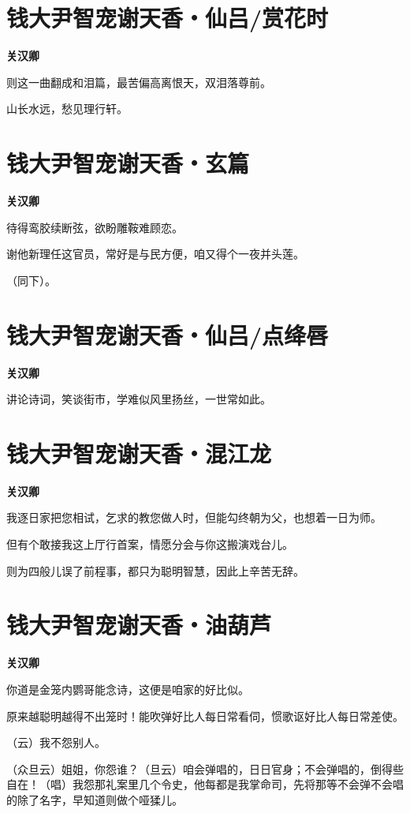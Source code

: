 \documentclass[12pt,a4paper]{ctexbook}
\begin{document}
\section{钱大尹智宠谢天香・仙吕/赏花时}
\textbf{关汉卿}\par\vspace{0.5em}
则这一曲翻成和泪篇，最苦偏高离恨天，双泪落尊前。\par
山长水远，愁见理行轩。\par

\section{钱大尹智宠谢天香・玄篇}
\textbf{关汉卿}\par\vspace{0.5em}
待得鸾胶续断弦，欲盼雕鞍难顾恋。\par
谢他新理任这官员，常好是与民方便，咱又得个一夜并头莲。\par
（同下）。\par

\section{钱大尹智宠谢天香・仙吕/点绛唇}
\textbf{关汉卿}\par\vspace{0.5em}
讲论诗词，笑谈街市，学难似风里扬丝，一世常如此。\par

\section{钱大尹智宠谢天香・混江龙}
\textbf{关汉卿}\par\vspace{0.5em}
我逐日家把您相试，乞求的教您做人时，但能勾终朝为父，也想着一日为师。\par
但有个敢接我这上厅行首案，情愿分会与你这搬演戏台儿。\par
则为四般儿误了前程事，都只为聪明智慧，因此上辛苦无辞。\par

\section{钱大尹智宠谢天香・油葫芦}
\textbf{关汉卿}\par\vspace{0.5em}
你道是金笼内鹦哥能念诗，这便是咱家的好比似。\par
原来越聪明越得不出笼时！能吹弹好比人每日常看伺，惯歌讴好比人每日常差使。\par
（云）我不怨别人。\par
（众旦云）姐姐，你怨谁？（旦云）咱会弹唱的，日日官身；不会弹唱的，倒得些自在！（唱）我怨那礼案里几个令史，他每都是我掌命司，先将那等不会弹不会唱的除了名字，早知道则做个哑猱儿。\par
\end{document}
